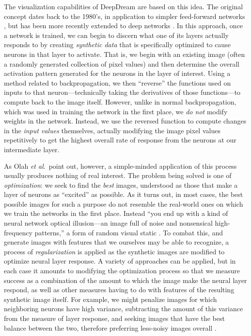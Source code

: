 \documentclass[leqno,12pt]{article}
\begin{document}
The visualization capabilities of DeepDream are based on this idea.  The original concept dates back to the
1980's, in application to simpler feed-forward networks \cite{Lewis88}, but has been more recently extended to
deep networks \cite{Erhan09,Olah17}.  In this approach, once a network is trained, we can begin to discern what
one of its layers actually responds to by creating \emph{synthetic data} that is specifically optimized to
cause neurons in that layer to activate.  That is, we begin with an existing image (often a randomly generated
collection of pixel values) and then determine the overall activation pattern generated for the neurons in the
layer of interest.  Using a method related to backpropagation, we then ``reverse'' the functions used on inputs
to that neuron---technically taking the derivatives of those functions---to compute back to the image itself.
However, unlike in normal backpropagation, which was used in training the network in the first place, we
\emph{do not} modify weights in the network.  Instead, we use the reversed function to compute changes in the
\emph{input values} themselves, actually modifying the image pixel values repetitively to get the highest
overall rate of response from the neurons at our intermediate layer.

As Olah \emph{et al}.\ point out, however, a simple-minded application of this process usually produces nothing
of real interest. The problem being solved is one of \emph{optimization}: we seek to find the \emph{best}
images, understood as those that make a layer of neurons as ``excited'' as possible.  As it turns out, in most
cases, the best possible images for such a purpose do not resemble the real-world ones on which we train the
networks in the first place.  Instead ``you end up with a kind of neural network optical illusion---an image
full of noise and nonsensical high-frequency patterns,'' a form of random visual static \cite{Olah17}.  To
combat this, and generate images with features that we ourselves may be able to recognize, a process of
\emph{regularization} is applied as the synthetic images are modified to optimize neural layer response.  A
variety of approaches can be applied, but in each case it amounts to modifying the optimization process so that
we measure success as a combination of the amount to which the image make the neural layer respond, as well as 
other measures having to do with features of the resulting synthetic image itself.  For example, we might
penalize images for which neighboring neurons have high variance, subtracting the amount of this variance from
the measure of layer response, and seeking images that have the best balance between the two, therefore
preferring less-noisy images overall \cite{mahendran15}.  
\end{document}

